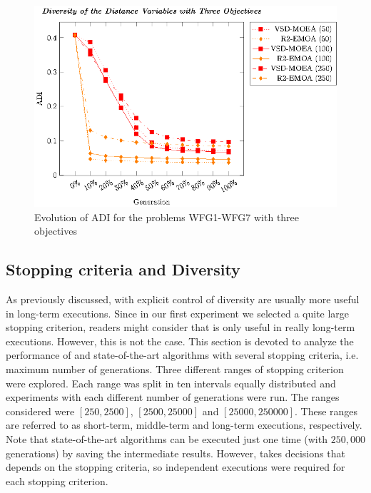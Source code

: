 %
%

\begin{figure}[t]
\centering
%
\includegraphics[scale=0.85]{Images/Graphic-Diversity_3obj_tikz-figure1.eps}
\caption{Evolution of ADI for the problems WFG1-WFG7 with three objectives}\label{fig:Diversity_3obj}
\end{figure}
%

\subsection{Stopping criteria and Diversity}

As previously discussed, \EAS{} with explicit control of diversity are usually more useful in long-term executions.
%
Since in our first experiment we selected a quite large stopping criterion, readers might consider that \VSDMOEA{} is only
useful in really long-term executions.
%
However, this is not the case.
%
This section is devoted to analyze the performance of \VSDMOEA{} and state-of-the-art algorithms with several stopping criteria, 
i.e. maximum number of generations.
%
Three different ranges of stopping criterion were explored.
%
Each range was split in ten intervals equally distributed and experiments with each different number of generations were run.
%
The ranges considered were $[250, 2500]$, $[2500, 25000]$ and $[25000, 250000]$.
%
These ranges are referred to as short-term, middle-term and long-term executions, respectively.
%
Note that state-of-the-art algorithms can be executed just one time (with $250,000$ generations) by saving the intermediate results.
%
However, \VSDMOEA{} takes decisions that depends on the stopping criteria, so independent executions were required for each stopping criterion.

